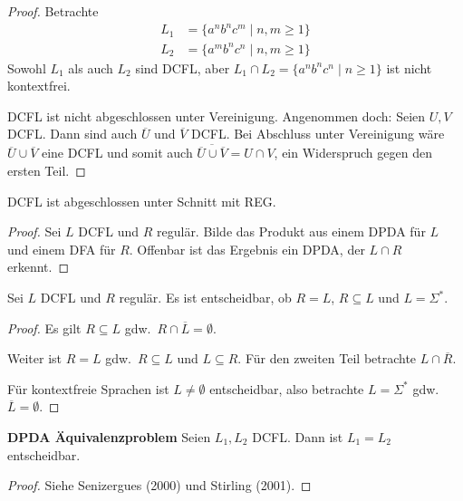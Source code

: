 \begin{proof}
    Betrachte
    \begin{align*}
        L_1 &= \{ a^nb^nc^m \mid n, m \ge 1 \} \\
        L_2 &= \{ a^mb^nc^n \mid n, m \ge 1 \}
    \end{align*}
    Sowohl $L_1$ als auch $L_2$ sind DCFL, aber $L_1 \cap L_2 = \{ a^nb^nc^n \mid n \ge 1\}$ ist nicht kontextfrei.
    
    DCFL ist nicht abgeschlossen unter Vereinigung. Angenommen doch: Seien $U, V$ DCFL. Dann sind auch $\overline{U}$ und $\overline{V}$ DCFL. Bei Abschluss unter Vereinigung wäre $\overline{U} \cup \overline{V}$ eine DCFL und somit auch $\overline{\overline{U} \cup \overline{V}} = U \cap V$, ein Widerspruch gegen den ersten Teil.
\end{proof}
\begin{Satz}
    DCFL ist abgeschlossen unter Schnitt mit REG.
\end{Satz}
\begin{proof}
    Sei $L$ DCFL und $R$ regulär.
    Bilde das Produkt aus einem DPDA für $L$ und einem DFA für $R$.
    Offenbar ist das Ergebnis ein DPDA, der $L\cap R$ erkennt.
\end{proof}
\begin{Satz}
    Sei $L$ DCFL und $R$ regulär.
    Es ist entscheidbar, ob $R=L$, $R\subseteq L$ und $L=\Sigma^*$.
\end{Satz}
\begin{proof}
    Es gilt $R\subseteq L$ gdw.\ $R \cap \overline{L} = \emptyset$.
    
    Weiter ist $R = L$ gdw.\ $R\subseteq L$ und $L \subseteq R$. Für den zweiten Teil betrachte $L\cap \overline{R}$.
    
    Für kontextfreie Sprachen ist $L\ne \emptyset$ entscheidbar, also betrachte $L=\Sigma^*$ gdw.\ $\overline{L}=\emptyset$.
\end{proof}

\begin{Satz} \textbf{DPDA Äquivalenzproblem}
    Seien $L_1, L_2$ DCFL. Dann ist $L_1 = L_2$ entscheidbar.
\end{Satz}

\begin{proof}
    Siehe Senizergues (2000) und Stirling (2001).
\end{proof}
